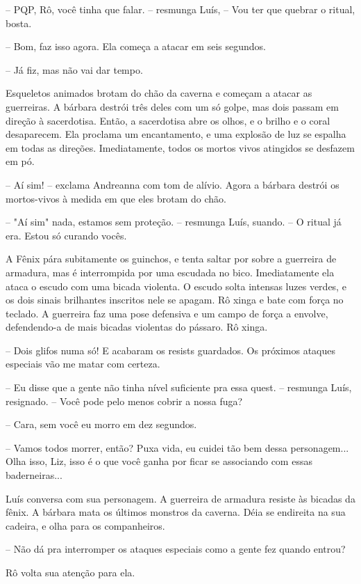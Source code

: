 -- PQP, Rô, você tinha que falar. -- resmunga Luís, -- Vou ter que quebrar o ritual, bosta.

-- Bom, faz isso agora. Ela começa a atacar em seis segundos.

-- Já fiz, mas não vai dar tempo.

Esqueletos animados brotam do chão da caverna e começam a atacar as guerreiras. A bárbara destrói três deles com um só golpe, mas dois passam em direção à sacerdotisa. Então, a sacerdotisa abre os olhos, e o brilho e o coral desaparecem. Ela proclama um encantamento, e uma explosão de luz se espalha em todas as direções. Imediatamente, todos os mortos vivos atingidos se desfazem em pó.

-- Aí sim! -- exclama Andreanna com tom de alívio. Agora a bárbara destrói os mortos-vivos à medida em que eles brotam do chão.

-- "Aí sim" nada, estamos sem proteção. -- resmunga Luís, suando. -- O ritual já era. Estou só curando vocês.

A Fênix pára subitamente os guinchos, e tenta saltar por sobre a guerreira de armadura, mas é interrompida por uma escudada no bico. Imediatamente ela ataca o escudo com uma bicada violenta. O escudo solta intensas luzes verdes, e os dois sinais brilhantes inscritos nele se apagam. Rô xinga e bate com força no teclado. A guerreira faz uma pose defensiva e um campo de força a envolve, defendendo-a de mais bicadas violentas do pássaro. Rô xinga.

-- Dois glifos numa só! E acabaram os resists guardados. Os próximos ataques especiais vão me matar com certeza.

-- Eu disse que a gente não tinha nível suficiente pra essa quest. -- resmunga Luís, resignado. -- Você pode pelo menos cobrir a nossa fuga?

-- Cara, sem você eu morro em dez segundos.

-- Vamos todos morrer, então? Puxa vida, eu cuidei tão bem dessa personagem... Olha isso, Liz, isso é o que você ganha por ficar se associando com essas baderneiras...

Luís conversa com sua personagem. A guerreira de armadura resiste às bicadas da fênix. A bárbara mata os últimos monstros da caverna. Déia se endireita na sua cadeira, e olha para os companheiros.

-- Não dá pra interromper os ataques especiais como a gente fez quando entrou?

Rô volta sua atenção para ela.

